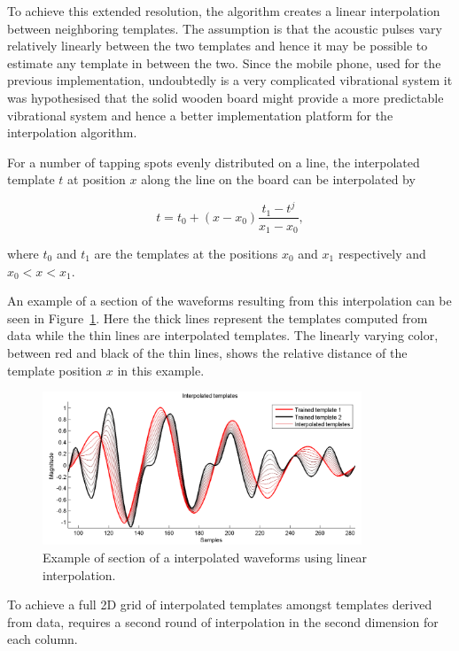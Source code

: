 To achieve this extended resolution, the algorithm creates a linear interpolation between neighboring templates. The assumption is that the acoustic pulses vary relatively linearly between the two templates and hence it may be possible to estimate any template in between the two. Since the mobile phone, used for the previous implementation, undoubtedly is a very complicated vibrational system it was hypothesised that the solid wooden board might provide a more predictable vibrational system and hence a better implementation platform for the interpolation algorithm.

For a number of tapping spots evenly distributed on a line, the interpolated template $t$ at position $x$ along the line on the board can be interpolated by

\begin{equation}\label{eq:interp}
t = t_0 + \left(x - x_0\right) \frac{t_{1} - t^j}{x_1 - x_0},
\end{equation}

where $t_0$ and $t_1$ are the templates at the positions $x_0$ and $x_1$ respectively and \linebreak[0]$x_0 < x < x_1$.

An example of a section of the waveforms resulting from this interpolation can be seen in Figure~\ref{fig:InterpData}. Here the thick lines represent the templates computed from data while the thin lines are interpolated templates. The linearly varying color, between red and black of the thin lines, shows the relative distance of the template position $x$ in this example.

\begin{figure}[!]
\centering
\includegraphics[width=360px]{InterpData.pdf}
\caption{Example of section of a interpolated waveforms using linear interpolation.}\label{fig:InterpData}
\end{figure}

To achieve a full 2D grid of interpolated templates amongst templates derived from data, requires a second round of interpolation in the second dimension for each column.

